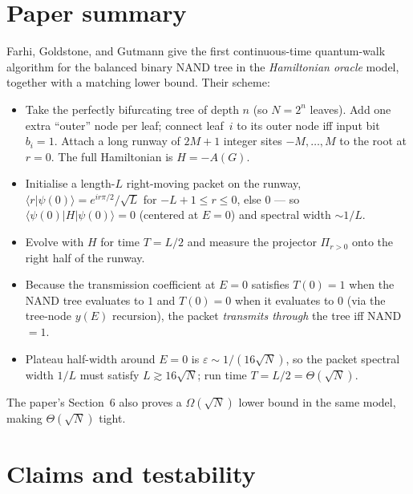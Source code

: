 \documentclass[11pt]{article}
\begin{document}
\section{Paper summary}
Farhi, Goldstone, and Gutmann give the first continuous-time quantum-walk
algorithm for the balanced binary NAND tree in the \emph{Hamiltonian oracle}
model, together with a matching lower bound. Their scheme:
\begin{itemize}
  \item Take the perfectly bifurcating tree of depth $n$ (so $N=2^n$ leaves).
        Add one extra ``outer'' node per leaf; connect leaf~$i$ to its outer
        node iff input bit $b_i=1$. Attach a long runway of $2M+1$ integer
        sites $-M,\dots,M$ to the root at $r=0$. The full Hamiltonian is
        $H = -A(G)$.
  \item Initialise a length-$L$ right-moving packet on the runway,
        $\langle r|\psi(0)\rangle = e^{ir\pi/2}/\sqrt L$ for
        $-L{+}1 \le r \le 0$, else $0$ --- so
        $\langle\psi(0)|H|\psi(0)\rangle=0$ (centered at $E=0$) and spectral
        width $\sim 1/L$.
  \item Evolve with $H$ for time $T=L/2$ and measure the projector
        $\Pi_{r>0}$ onto the right half of the runway.
  \item Because the transmission coefficient at $E=0$ satisfies
        $T(0)=1$ when the NAND tree evaluates to $1$ and $T(0)=0$ when it
        evaluates to $0$ (via the tree-node $y(E)$ recursion), the packet
        \emph{transmits through} the tree iff NAND$=1$.
  \item Plateau half-width around $E=0$ is $\varepsilon \sim 1/(16\sqrt N)$, so
        the packet spectral width $1/L$ must satisfy $L\gtrsim 16\sqrt N$;
        run time $T=L/2 = \Theta(\sqrt N)$.
\end{itemize}
The paper's Section~6 also proves a $\Omega(\sqrt N)$ lower bound in the same
model, making $\Theta(\sqrt N)$ tight.

\section{Claims and testability}
\end{document}
